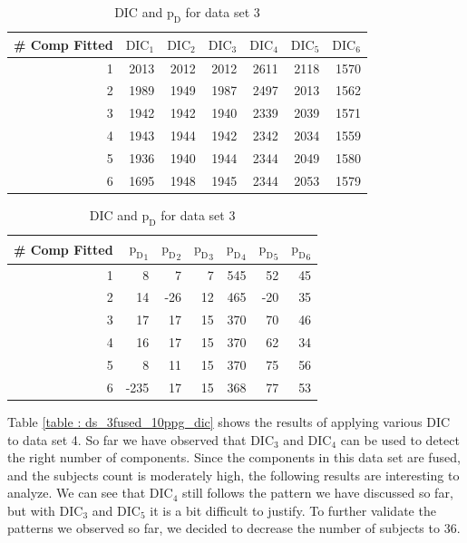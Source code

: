\begin{table}[!htb]
\centering
\caption{DIC and $\text{p}_\text{D}$ for data set 3}
\label{table : ds_3wellsep_3ppg_dic}
\begin{tabular}{@{}rrrrrrr@{}}
\toprule
\# Comp Fitted & $\text{DIC}_1$ & $\text{DIC}_2$  & $\text{DIC}_3$  & $\text{DIC}_4$  & $\text{DIC}_5$  & $\text{DIC}_6$  \\ \midrule
1 & 2013 & 2012 & 2012 & 2611 & 2118 & 1570 \\
2 & 1989 & 1949 & 1987 & 2497 & 2013 & 1562 \\
3 & 1942 & 1942 & 1940 & 2339 & 2039 & 1571 \\
4 & 1943 & 1944 & 1942 & 2342 & 2034 & 1559 \\
5 & 1936 & 1940 & 1944 & 2344 & 2049 & 1580 \\
6 & 1695 & 1948 & 1945 & 2344 & 2053 & 1579 \\ \bottomrule
\end{tabular}

\begin{tabular}{@{}rrrrrrr@{}}
\toprule
\# Comp Fitted & ${\text{p}_\text{D}}_1$ & ${\text{p}_\text{D}}_2$ & ${\text{p}_\text{D}}_3$ & ${\text{p}_\text{D}}_4$ & ${\text{p}_\text{D}}_5$ & ${\text{p}_\text{D}}_6$ \\ \midrule
1 & 8 & 7 & 7 & 545 & 52 & 45 \\
2 & 14 & -26 & 12 & 465 & -20 & 35 \\
3 & 17 & 17 & 15 & 370 & 70 & 46 \\
4 & 16 & 17 & 15 & 370 & 62 & 34 \\
5 & 8 & 11 & 15 & 370 & 75 & 56 \\
6 & -235 & 17 & 15 & 368 & 77 & 53 \\ \bottomrule
\end{tabular}
\end{table}

Table \ref{table : ds_3fused_10ppg_dic} shows the results of applying various DIC to data set 4. So far we have observed that $\text{DIC}_3$ and $\text{DIC}_4$ can be used to detect the right number of components. Since the components in this data set are fused, and the subjects count is moderately high, the following results are interesting to analyze. We can see that $\text{DIC}_4$ still follows the pattern we have discussed so far, but with $\text{DIC}_3$ and $\text{DIC}_5$ it is a bit difficult to justify. To further validate the patterns we observed so far, we decided to decrease the number of subjects to 36.\\
 
